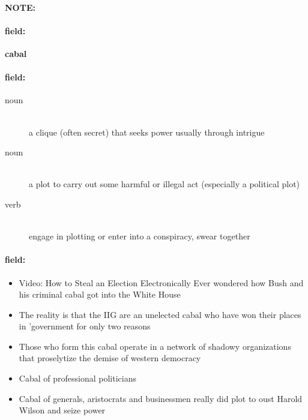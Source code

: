 \documentclass[12pt]{article}
\newenvironment{note}{\paragraph{NOTE:}}{}
\newenvironment{field}{\paragraph{field:}}{}
\begin{document}
\begin{note}
\begin{field}
\textbf{\large cabal}
\end{field}


\begin{field}
\begin{description}
\item[noun] \hfill \\ 
a clique (often secret) that seeks power usually through intrigue

\item[noun] \hfill \\ 
a plot to carry out some harmful or illegal act (especially a political plot)

\item[verb] \hfill \\ 
engage in plotting or enter into a conspiracy, swear together

\end{description}
\end{field}

\begin{field}
\begin{itemize}
\item Video: How to Steal an Election  Electronically Ever wondered how Bush and his criminal cabal got into the White House
\item The reality is that the IIG are an unelected cabal who have won their places in 'government for only two reasons
\item Those who form this cabal operate in a network of shadowy organizations that proselytize the demise of western democracy
\item Cabal of professional politicians
\item Cabal of generals, aristocrats and businessmen really did plot to oust Harold Wilson and seize power
\end{itemize}
\end{field}
\end{note}
\end{document}
